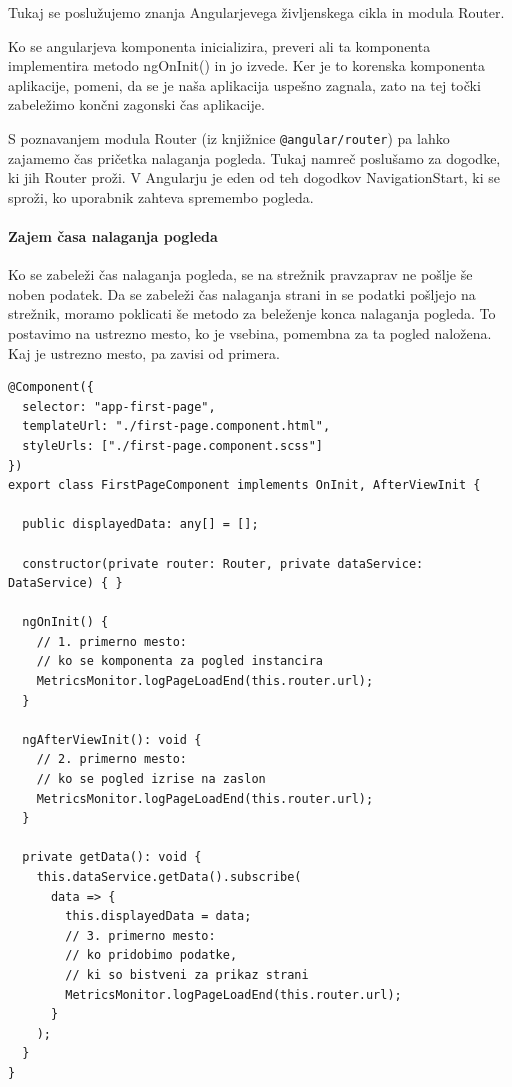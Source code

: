 \documentclass[a4paper, 12pt]{book}
\begin{document}
Tukaj se poslužujemo znanja Angularjevega življenskega cikla in modula Router.

Ko se angularjeva komponenta inicializira, preveri ali ta komponenta implementira metodo ngOnInit() in jo izvede. Ker je to korenska komponenta aplikacije, pomeni, da se je naša aplikacija uspešno zagnala, zato na tej točki zabeležimo končni zagonski čas aplikacije.

S poznavanjem modula Router (iz knjižnice \verb|@angular/router|) pa lahko zajamemo čas pričetka nalaganja pogleda. Tukaj namreč poslušamo za dogodke, ki jih Router proži. V Angularju je eden od teh dogodkov NavigationStart, ki se sproži, ko uporabnik zahteva spremembo pogleda.

\paragraph{Zajem časa nalaganja pogleda}

Ko se zabeleži čas nalaganja pogleda, se na strežnik pravzaprav ne pošlje še noben podatek. Da se zabeleži čas nalaganja strani in se podatki pošljejo na strežnik, moramo poklicati še metodo za beleženje konca nalaganja pogleda. To postavimo na ustrezno mesto, ko je vsebina, pomembna za ta pogled naložena. Kaj je ustrezno mesto, pa zavisi od primera.

\begin{lstlisting}[label=code:lib_page_comp, caption=Zajem časa nalaganja pogleda]
@Component({
  selector: "app-first-page",
  templateUrl: "./first-page.component.html",
  styleUrls: ["./first-page.component.scss"]
})
export class FirstPageComponent implements OnInit, AfterViewInit {

  public displayedData: any[] = [];

  constructor(private router: Router, private dataService: DataService) { }

  ngOnInit() {
    // 1. primerno mesto:
    // ko se komponenta za pogled instancira
    MetricsMonitor.logPageLoadEnd(this.router.url);
  }

  ngAfterViewInit(): void {
    // 2. primerno mesto:
    // ko se pogled izrise na zaslon
    MetricsMonitor.logPageLoadEnd(this.router.url);
  }

  private getData(): void {
    this.dataService.getData().subscribe(
      data => {
        this.displayedData = data;
        // 3. primerno mesto:
        // ko pridobimo podatke,
        // ki so bistveni za prikaz strani
        MetricsMonitor.logPageLoadEnd(this.router.url);
      }
    );
  }
}
\end{lstlisting}
\end{document}
